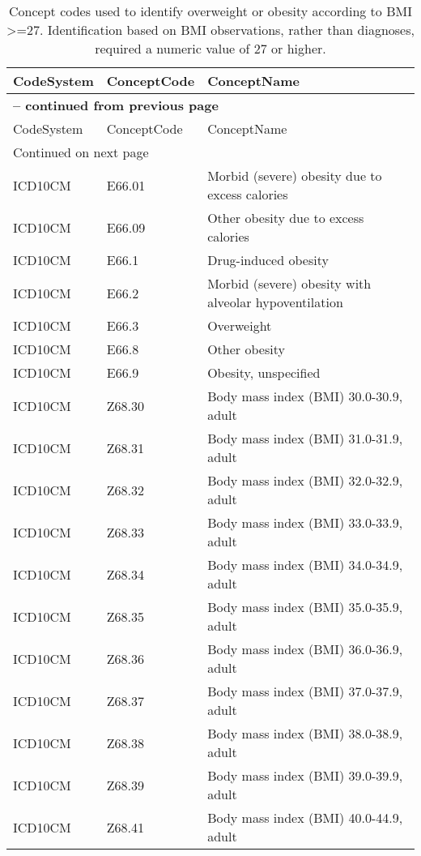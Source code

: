 \begin{longtable}{p{}p{}p{}}
\caption{Concept codes used to identify overweight or obesity according to BMI >=27. Identification based on BMI observations, rather than diagnoses, required a numeric value of 27 or higher.} \\ 
 CodeSystem & ConceptCode & ConceptName \\ 
  \hline 
\endfirsthead 
\multicolumn{3}{p{\textwidth}}{{ \bfseries \tablename \thetable{} -- continued from previous page}} \\ 
\hline CodeSystem & ConceptCode & ConceptName \\ \hline 
\endhead 
\hline \multicolumn{3}{p{\textwidth}}{{Continued on next page}} \\ \hline 
\endfoot 
\hline 
\endlastfoot 
 \hline
ICD10CM & E66.01 & Morbid (severe) obesity due to excess calories \\ 
  ICD10CM & E66.09 & Other obesity due to excess calories \\ 
  ICD10CM & E66.1 & Drug-induced obesity \\ 
  ICD10CM & E66.2 & Morbid (severe) obesity with alveolar hypoventilation \\ 
  ICD10CM & E66.3 & Overweight \\ 
  ICD10CM & E66.8 & Other obesity \\ 
  ICD10CM & E66.9 & Obesity, unspecified \\ 
  ICD10CM & Z68.30 & Body mass index (BMI) 30.0-30.9, adult \\ 
  ICD10CM & Z68.31 & Body mass index (BMI) 31.0-31.9, adult \\ 
  ICD10CM & Z68.32 & Body mass index (BMI) 32.0-32.9, adult \\ 
  ICD10CM & Z68.33 & Body mass index (BMI) 33.0-33.9, adult \\ 
  ICD10CM & Z68.34 & Body mass index (BMI) 34.0-34.9, adult \\ 
  ICD10CM & Z68.35 & Body mass index (BMI) 35.0-35.9, adult \\ 
  ICD10CM & Z68.36 & Body mass index (BMI) 36.0-36.9, adult \\ 
  ICD10CM & Z68.37 & Body mass index (BMI) 37.0-37.9, adult \\ 
  ICD10CM & Z68.38 & Body mass index (BMI) 38.0-38.9, adult \\ 
  ICD10CM & Z68.39 & Body mass index (BMI) 39.0-39.9, adult \\ 
  ICD10CM & Z68.41 & Body mass index (BMI) 40.0-44.9, adult \\ 

\end{longtable}
